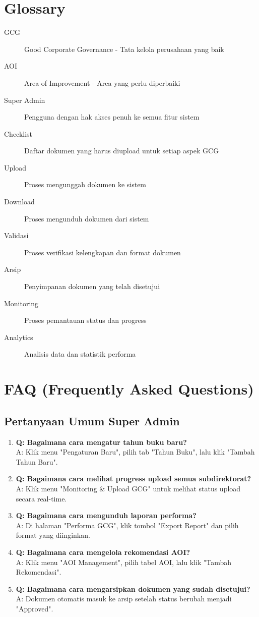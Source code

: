\documentclass[12pt,a4paper]{article}
\begin{document}
\section{Glossary}
\begin{description}
\item[GCG] Good Corporate Governance - Tata kelola perusahaan yang baik
\item[AOI] Area of Improvement - Area yang perlu diperbaiki
\item[Super Admin] Pengguna dengan hak akses penuh ke semua fitur sistem
\item[Checklist] Daftar dokumen yang harus diupload untuk setiap aspek GCG
\item[Upload] Proses mengunggah dokumen ke sistem
\item[Download] Proses mengunduh dokumen dari sistem
\item[Validasi] Proses verifikasi kelengkapan dan format dokumen
\item[Arsip] Penyimpanan dokumen yang telah disetujui
\item[Monitoring] Proses pemantauan status dan progress
\item[Analytics] Analisis data dan statistik performa
\end{description}

\section{FAQ (Frequently Asked Questions)}

\subsection{Pertanyaan Umum Super Admin}
\begin{enumerate}
\item \textbf{Q: Bagaimana cara mengatur tahun buku baru?}\\
A: Klik menu "Pengaturan Baru", pilih tab "Tahun Buku", lalu klik "Tambah Tahun Baru".

\item \textbf{Q: Bagaimana cara melihat progress upload semua subdirektorat?}\\
A: Klik menu "Monitoring \& Upload GCG" untuk melihat status upload secara real-time.

\item \textbf{Q: Bagaimana cara mengunduh laporan performa?}\\
A: Di halaman "Performa GCG", klik tombol "Export Report" dan pilih format yang diinginkan.

\item \textbf{Q: Bagaimana cara mengelola rekomendasi AOI?}\\
A: Klik menu "AOI Management", pilih tabel AOI, lalu klik "Tambah Rekomendasi".

\item \textbf{Q: Bagaimana cara mengarsipkan dokumen yang sudah disetujui?}\\
A: Dokumen otomatis masuk ke arsip setelah status berubah menjadi "Approved".
\end{enumerate}
\end{document}
